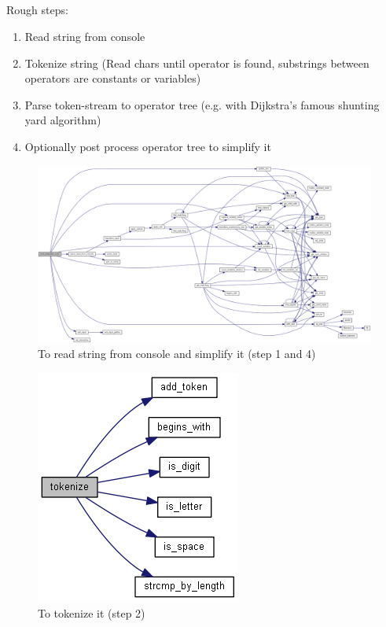 \newpage
\subsection{}

    Rough steps:
    \begin{enumerate}
        \item Read string from console
        \item Tokenize string (Read chars until operator is found, substrings between operators are constants or variables)
        \item Parse token-stream to operator tree (e.g. with Dijkstra's famous shunting yard algorithm)
        \item Optionally post process operator tree to simplify it
    \end{enumerate}

    \begin{figure}[H]
        \centering
        \includegraphics[width=\linewidth]{images/ex7/read_and_simplify.png}
        \caption{To read string from console and simplify it (step 1 and 4)}
    \end{figure}

    \begin{figure}[H]
        \centering
        \includegraphics[width=0.3\linewidth]{images/ex7/tokenize.png}
        \caption{To tokenize it (step 2)}
    \end{figure}

